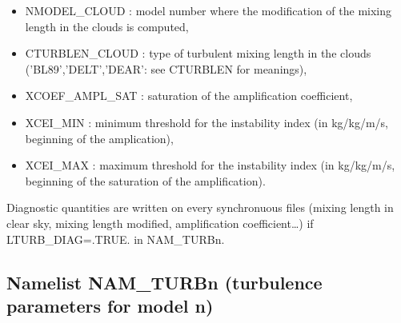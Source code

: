 \begin{itemize}
\item NMODEL\_CLOUD :
model number where the modification of the mixing length in the clouds is
computed,
\item CTURBLEN\_CLOUD :
type of turbulent mixing length in the clouds
 ('BL89','DELT','DEAR': see CTURBLEN for meanings),
\item XCOEF\_AMPL\_SAT :
saturation of the amplification coefficient,
\item XCEI\_MIN :
minimum threshold for the instability index (in kg/kg/m/s,
 beginning of the amplication),
\item XCEI\_MAX :
maximum threshold for the instability index (in kg/kg/m/s,
 beginning of the saturation of the amplification).
\end{itemize}
Diagnostic quantities are written on every synchronuous files 
(mixing length in clear sky, mixing length modified, amplification coefficient\ldots) if LTURB\_DIAG=.TRUE. in NAM\_TURBn.
\subsection{Namelist NAM\_TURBn (turbulence parameters for model n)}

